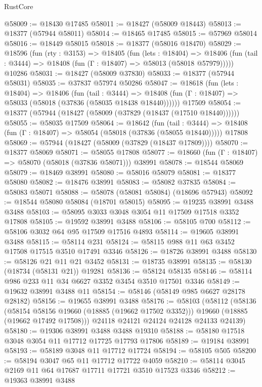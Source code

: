 \begin{lexlean}{RustCore}
\begin{coremodule}
@58009 := @18430 @17485
@58011 := @18427 (@58009 @18443)
@58013 := @18377 (@57944 @58011)
@58014 := @18465 @17485
@58015 := @57969 @58014
@58016 := @18449 @58015
@58018 := @18377 (@58016 @18470)
@58029 := @18596
    (fun (rty : @3153) =>
    @18405
      (fun (lets : @18404) =>
      @18406 (fun (tail : @3444) => @18408 (fun (Γ : @18407) => @58013 (@58018 @57979)))))
    @10286
@58031 := @18427 (@58009 @37830)
@58033 := @18377 (@57944 @58031)
@58035 := @37837 @57974 @50286
@58047 := @18618
    (fun (lets : @18404) =>
    @18406
      (fun (tail : @3444) =>
      @18408 (fun (Γ : @18407) => @58033 (@58018 (@37836 (@58035 @18438 @18440))))))
    @17509
@58054 := @18377 (@57944 (@18427 (@58009 (@37829 (@18437 (@17510 @18440))))))
@58055 := @58035 @17509
@58064 := @18642
    (fun (tail : @3444) => @18408 (fun (Γ : @18407) => @58054 (@58018 (@37836 (@58055 @18440)))))
    @17808
@58069 := @57944 (@18427 (@58009 (@37829 (@18437 @17809))))
@58070 := @18377 @58069
@58071 := @58055 @17808
@58077 := @18660 (fun (Γ : @18407) => @58070 (@58018 (@37836 @58071))) @38991
@58078 := @18544 @58069
@58079 := @18469 @38991
@58080 := @58016 @58079
@58081 := @18377 @58080
@58082 := @18476 @38991
@58083 := @58082 @37835
@58084 := @58083 @58071
@58088 := @58078 (@58081 @58084) (@18696 @57943)
@58092 := @18544 @58080 @58084 (@18701 @58015)
@58095 := @19235 @38991 @3488 @3488
@58103 := @58095 @3033 @3048 @3054 @11 @17509 @17518 @3352 @17808
@58105 := @19592 @38991 @3488
@58106 := @58105 @700
@58112 := @58106 @3032 @64 @95 @17509 @17516 @4893
@58114 := @19605 @38991 @3488
@58115 := @58114 @231
@58124 := @58115 @988 @11 @63 @3452 @17508 @17515 @3510 @17491 @3346
@58126 := @18726 @38991 @3488
@58130 := @58126 @21 @11 @21 @3452
@58131 := @18735 @38991
@58135 := @58130 (@18734 (@58131 @21)) @19281
@58136 := @58124 @58135
@58146 := @58114 @986 @233 @11 @34 @6627 @3352 @3454 @3510 @17501 @3346
@58149 := @19632 @38991 @3488 @11
@58154 := @58146 (@58149 @985 @6627 @28178 @28182)
@58156 := @19655 @38991 @3488
@58176 := @58103
    (@58112
      (@58136
        (@58154 @58156 @19660 (@18885 (@19662 @17502 @3352)))
        @19660
        (@18885 (@19662 @17492 @17508)))
      @24118
      @24121
      @24124
      @24128
      @24133
      @24139)
@58180 := @19306 @38991 @3488 @3488 @19310
@58188 := @58180 @17518 @3048 @3054 @11 @17712 @17725 @17793 @17806
@58189 := @19184 @38991
@58193 := @58189 @3048 @11 @17712 @17724
@58194 := @58105 @505
@58200 := @58194 @3047 @65 @11 @17712 @17722 @4059
@58210 := @58114 @3045 @2169 @11 @64 @17687 @17711 @17721 @3510 @17523 @3346
@58212 := @19363 @38991 @3488

\end{coremodule}
\end{lexlean}
